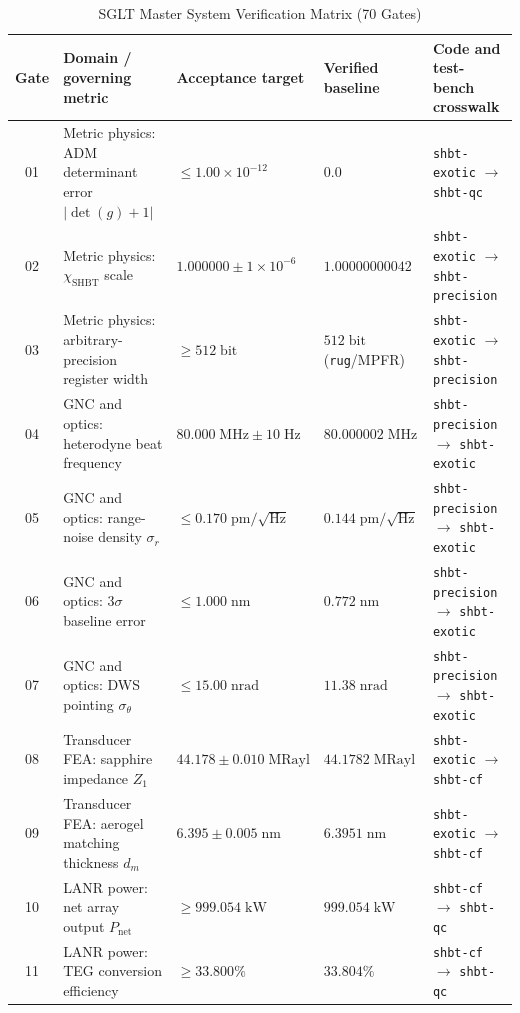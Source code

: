 \documentclass[10pt,twocolumn]{IEEEtran}
\begin{document}
\begin{table}[t]
\caption{SGLT Master System Verification Matrix (70 Gates)}
\label{tab:master_verification}
\centering
\scriptsize
\begin{tabular}{@{}cp{4.3cm}p{3.5cm}p{3.3cm}p{3.6cm}@{}}
\toprule
Gate & Domain / governing metric & Acceptance target & Verified baseline & Code and test-bench crosswalk \\
\midrule
01 & Metric physics: ADM determinant error $|\det(g)+1|$ & $\leq1.00\times10^{-12}$ & $0.0$ & \texttt{shbt-exotic} $\rightarrow$ \texttt{shbt-qc} \\
02 & Metric physics: $\chi_{\mathrm{SHBT}}$ scale & $1.000000\pm1\times10^{-6}$ & $1.00000000042$ & \texttt{shbt-exotic} $\rightarrow$ \texttt{shbt-precision} \\
03 & Metric physics: arbitrary-precision register width & $\geq512\;\mathrm{bit}$ & $512\;\mathrm{bit}$ (\texttt{rug}/MPFR) & \texttt{shbt-exotic} $\rightarrow$ \texttt{shbt-precision} \\
04 & GNC and optics: heterodyne beat frequency & $80.000\;\mathrm{MHz}\pm10\;\mathrm{Hz}$ & $80.000002\;\mathrm{MHz}$ & \texttt{shbt-precision} $\rightarrow$ \texttt{shbt-exotic} \\
05 & GNC and optics: range-noise density $\sigma_r$ & $\leq0.170\;\mathrm{pm}/\sqrt{\mathrm{Hz}}$ & $0.144\;\mathrm{pm}/\sqrt{\mathrm{Hz}}$ & \texttt{shbt-precision} $\rightarrow$ \texttt{shbt-exotic} \\
06 & GNC and optics: $3\sigma$ baseline error & $\leq1.000\;\mathrm{nm}$ & $0.772\;\mathrm{nm}$ & \texttt{shbt-precision} $\rightarrow$ \texttt{shbt-exotic} \\
07 & GNC and optics: DWS pointing $\sigma_\theta$ & $\leq15.00\;\mathrm{nrad}$ & $11.38\;\mathrm{nrad}$ & \texttt{shbt-precision} $\rightarrow$ \texttt{shbt-exotic} \\
08 & Transducer FEA: sapphire impedance $Z_1$ & $44.178\pm0.010\;\mathrm{MRayl}$ & $44.1782\;\mathrm{MRayl}$ & \texttt{shbt-exotic} $\rightarrow$ \texttt{shbt-cf} \\
09 & Transducer FEA: aerogel matching thickness $d_m$ & $6.395\pm0.005\;\mathrm{nm}$ & $6.3951\;\mathrm{nm}$ & \texttt{shbt-exotic} $\rightarrow$ \texttt{shbt-cf} \\
10 & LANR power: net array output $P_{\mathrm{net}}$ & $\geq999.054\;\mathrm{kW}$ & $999.054\;\mathrm{kW}$ & \texttt{shbt-cf} $\rightarrow$ \texttt{shbt-qc} \\
11 & LANR power: TEG conversion efficiency & $\geq33.800\%$ & $33.804\%$ & \texttt{shbt-cf} $\rightarrow$ \texttt{shbt-qc} \\

\end{tabular}
\end{table}
\end{document}
